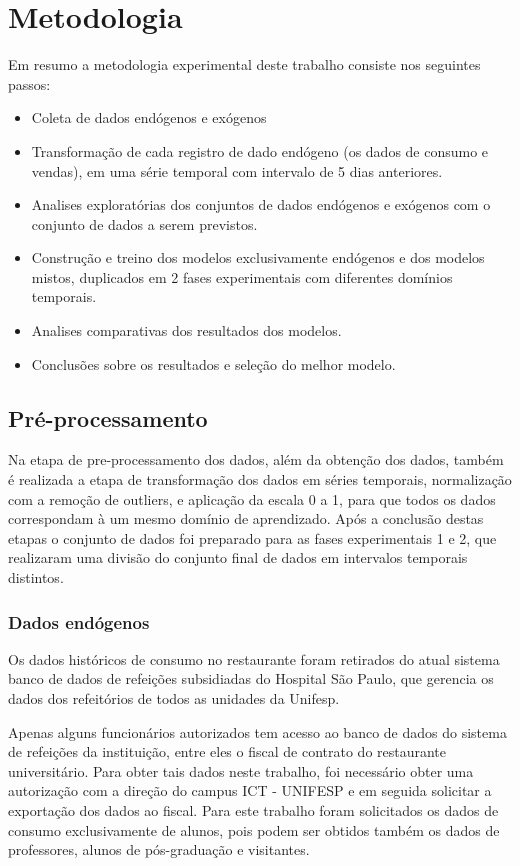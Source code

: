 \documentclass[	12pt, Times, openright, twoside, a4paper, english, brazil]{abntex2}
\begin{document}
  \chapter{Metodologia}
    Em resumo a metodologia experimental deste trabalho consiste nos seguintes passos:
    \begin{itemize}
        \item Coleta de dados endógenos e exógenos
        \item Transformação de cada registro de dado endógeno (os dados de consumo e vendas), em uma série temporal com intervalo de 5 dias anteriores.
        \item Analises exploratórias dos conjuntos de dados endógenos e exógenos com o conjunto de dados a serem previstos.
        \item Construção e treino dos modelos exclusivamente endógenos e dos modelos mistos, duplicados em 2 fases experimentais com diferentes domínios temporais.
        \item Analises comparativas dos resultados dos modelos.
        \item Conclusões sobre os resultados e seleção do melhor modelo.
    \end{itemize}
    
	\section{Pré-processamento}
	    Na etapa de pre-processamento dos dados, além da obtenção dos dados, também é realizada a etapa de transformação dos dados em séries temporais, normalização com a remoção de outliers, e aplicação da escala 0 a 1, para que todos os dados correspondam à um mesmo domínio de aprendizado.
	    Após a conclusão destas etapas o conjunto de dados foi preparado para as fases experimentais 1 e 2, que realizaram uma divisão do conjunto final de dados em intervalos temporais distintos.
	    
	    \subsection{Dados endógenos}
        	Os dados históricos de consumo no restaurante foram retirados do atual sistema banco de dados de refeições subsidiadas do Hospital São Paulo, que gerencia os dados dos refeitórios de todos as unidades da Unifesp.
        	
        	Apenas alguns funcionários autorizados tem acesso ao banco de dados do sistema de refeições da instituição, entre eles o fiscal de contrato do restaurante universitário. Para obter tais dados neste trabalho, foi necessário obter uma autorização com a direção do campus ICT - UNIFESP e em seguida solicitar a exportação dos dados ao fiscal. Para este trabalho foram solicitados os dados de consumo exclusivamente de alunos, pois podem ser obtidos também os dados de professores, alunos de pós-graduação e visitantes. 
    
\end{document}
